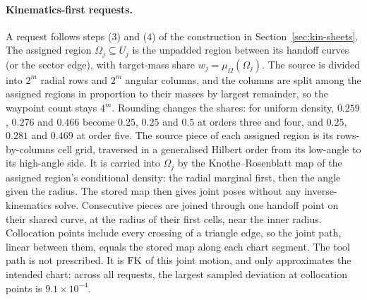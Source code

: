 \paragraph{Kinematics-first requests.}
A request follows steps (3) and (4) of the construction in Section~\ref{sec:kin-sheets}. The assigned region $\Omega_j\subseteq U_j$ is the unpadded region between its handoff curves (or the sector edge), with target-mass share $w_j=\mu_\Omega(\Omega_j)$. The source is divided into $2^m$ radial rows and $2^m$ angular columns, and the columns are split among the assigned regions in proportion to their masses by largest remainder, so the waypoint count stays $4^m$. Rounding changes the shares: for uniform density, $0.259$, $0.276$ and $0.466$ become $0.25$, $0.25$ and $0.5$ at orders three and four, and $0.25$, $0.281$ and $0.469$ at order five. The source piece of each assigned region is its rows-by-columns cell grid, traversed in a generalised Hilbert order from its low-angle to its high-angle side. It is carried into $\Omega_j$ by the Knothe--Rosenblatt map of the assigned region's conditional density: the radial marginal first, then the angle given the radius. The stored map then gives joint poses without any inverse-kinematics solve. Consecutive pieces are joined through one handoff point on their shared curve, at the radius of their first cells, near the inner radius. Collocation points include every crossing of a triangle edge, so the joint path, linear between them, equals the stored map along each chart segment. The tool path is not prescribed. It is $\operatorname{FK}$ of this joint motion, and only approximates the intended chart: across all requests, the largest sampled deviation at collocation points is $9.1\times10^{-4}$.

